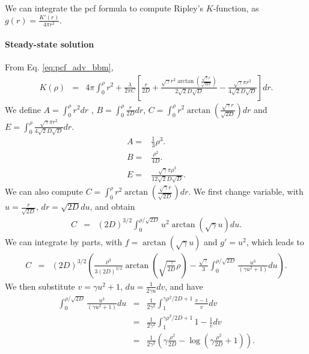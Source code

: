 \documentclass[12pt,english]{article}
\begin{document}
We can integrate the pcf formula to compute Ripley's $K$-function,
as $g(r)=\frac{K'(r)}{4\pi r^{2}}$.

\paragraph{Steady-state solution}

From Eq. \ref{eq:pcf_adv_bbm}, 
\begin{equation}
\begin{array}{ccc}
K(\rho) & = & 4\pi\int_{0}^{\rho}r^{2}+\frac{\lambda}{2\pi C}\left[\frac{r}{2D}+\frac{\sqrt{\gamma}r^{2}\arctan\left(\frac{\sqrt{\gamma}r}{\sqrt{2D}}\right)}{2\sqrt{2}D\sqrt{D}}-\frac{\sqrt{\gamma}\pi r^{2}}{4\sqrt{2}D\sqrt{D}}\right]dr.\end{array}\label{eq:start-K}
\end{equation}
We define $A=\int_{0}^{\rho}r^{2}dr$ , $B=\int_{0}^{\rho}\frac{r}{2D}dr$,
$C=\int_{0}^{\rho}r^{2}\arctan\left(\frac{\sqrt{\gamma}r}{\sqrt{2D}}\right)dr$
and $E=\int_{0}^{\rho}\frac{\sqrt{\gamma}\pi r^{2}}{4\sqrt{2}D\sqrt{D}}dr$.
\begin{equation}
\begin{array}{cc}
A= & \frac{1}{3}\rho^{3}.\\
B= & \frac{\rho^{2}}{4D}.\\
E= & \frac{\sqrt{\gamma}\pi\rho^{3}}{12\sqrt{2}D\sqrt{D}}.
\end{array}
\end{equation}
We can also compute $C=\int_{0}^{\rho}r^{2}\arctan\left(\frac{\sqrt{\gamma}r}{\sqrt{2D}}\right)dr$.
We first change variable, with $u=\frac{r}{\sqrt{2D}}$, $dr=\sqrt{2D}du$,
and obtain 
\begin{equation}
\begin{array}{ccc}
C & = & (2D)^{3/2}\int_{0}^{\rho/\sqrt{2D}}u^{2}\arctan(\sqrt{\gamma}u)du.\end{array}
\end{equation}
We can integrate by parts, with $f=\arctan(\sqrt{\gamma}u)$ and $g'=u^{2}$,
which leads to 
\begin{equation}
\begin{array}{ccc}
C & = & (2D)^{3/2}\left(\frac{\rho^{3}}{3(2D)^{3/2}}\arctan(\sqrt{\frac{\gamma}{2D}}\rho)-\frac{\sqrt{\gamma}}{3}\int_{0}^{\rho/\sqrt{2D}}\frac{u^{3}}{(\gamma u^{2}+1)}du\right).\end{array}
\end{equation}
We then substitute $v=\gamma u^{2}+1$, $du=\frac{1}{2\gamma u}dv$,
and have 
\begin{equation}
\begin{array}{ccc}
\int_{0}^{\rho/\sqrt{2D}}\frac{u^{3}}{(\gamma u^{2}+1)}du & = & \frac{1}{2\gamma^{2}}\int_{1}^{\gamma\rho^{2}/2D+1}\frac{v-1}{v}dv\\
 & = & \frac{1}{2\gamma^{2}}\int_{1}^{\gamma\rho^{2}/2D+1}1-\frac{1}{v}dv\\
 & = & \frac{1}{2\gamma^{2}}(\gamma\frac{\rho^{2}}{2D}-\log(\gamma\frac{\rho^{2}}{2D}+1)).
\end{array}
\end{equation}
\end{document}

